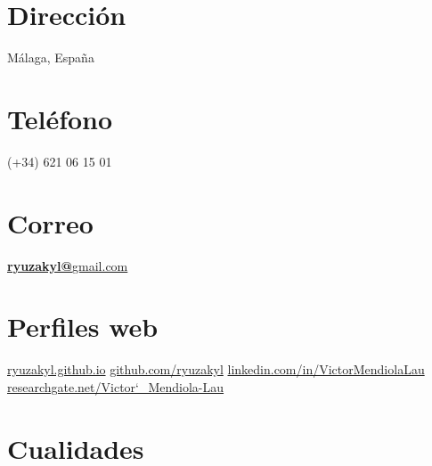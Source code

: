 \documentclass[]{friggeri-cv}
\begin{document}
      

\begin{aside}
  \section{Dirección}
    Málaga, España
    ~
    ~
    ~
  \section{Teléfono}
    (+34) 621 06 15 01
    ~
    ~
    ~
  \section{Correo}
    \href{mailto:ryuzakyl@gmail.com}{\textbf{ryuzakyl@}gmail.com}
	~
	~    
    ~
  \section{Perfiles web}
    \href{https://ryuzakyl.github.io}{{\scriptsize ryuzakyl.github.io}}
    \href{https://github.com/ryuzakyl}{{\scriptsize github.com/ryuzakyl}}
    \href{https://www.linkedin.com/in/victormendiolalau}{{\scriptsize linkedin.com/in/VictorMendiolaLau}}
	\href{https://www.researchgate.net/profile/Victor_Mendiola-Lau}{{\scriptsize researchgate.net/Victor\char`_Mendiola-Lau}}
    ~
    ~
    ~
  \section{Cualidades}
    ~
\end{aside}
\end{document}
